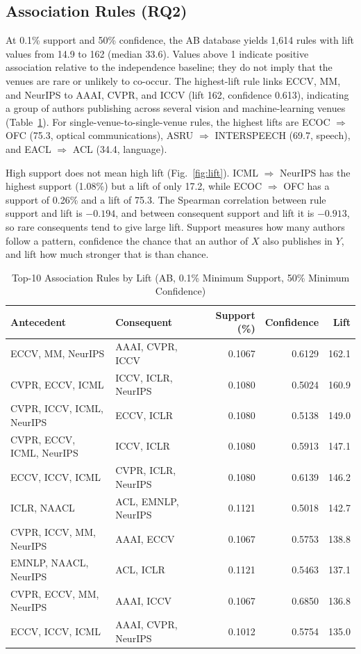 ﻿\documentclass[conference]{IEEEtran}
\begin{document}
\subsection{Association Rules (RQ2)}
At 0.1\% support and 50\% confidence, the AB database yields 1,614 rules with lift values from 14.9 to 162 (median 33.6). Values above 1 indicate positive association relative to the independence baseline; they do not imply that the venues are rare or unlikely to co-occur. The highest-lift rule links ECCV, MM, and NeurIPS to AAAI, CVPR, and ICCV (lift 162, confidence 0.613), indicating a group of authors publishing across several vision and machine-learning venues (Table~\ref{tab:rules}). For single-venue-to-single-venue rules, the highest lifts are ECOC $\Rightarrow$ OFC (75.3, optical communications), ASRU $\Rightarrow$ INTERSPEECH (69.7, speech), and EACL $\Rightarrow$ ACL (34.4, language).

High support does not mean high lift (Fig.~\ref{fig:lift}). ICML $\Rightarrow$ NeurIPS has the highest support (1.08\%) but a lift of only 17.2, while ECOC $\Rightarrow$ OFC has a support of 0.26\% and a lift of 75.3. The Spearman correlation between rule support and lift is $-0.194$, and between consequent support and lift it is $-0.913$, so rare consequents tend to give large lift. Support measures how many authors follow a pattern, confidence the chance that an author of $X$ also publishes in $Y$, and lift how much stronger that is than chance.

\begin{table}[t]
\caption{Top-10 Association Rules by Lift (AB, 0.1\% Minimum Support, 50\% Minimum Confidence)}
\label{tab:rules}
\centering
\scriptsize
\setlength{\tabcolsep}{3pt}
\begin{tabular}{p{3.15cm}p{3.15cm}rrr}
\toprule
Antecedent & Consequent & Support (\%) & Confidence & Lift \\
\midrule
ECCV, MM, NeurIPS & AAAI, CVPR, ICCV & 0.1067 & 0.6129 & 162.1 \\
CVPR, ECCV, ICML & ICCV, ICLR, NeurIPS & 0.1080 & 0.5024 & 160.9 \\
CVPR, ICCV, ICML, NeurIPS & ECCV, ICLR & 0.1080 & 0.5138 & 149.0 \\
CVPR, ECCV, ICML, NeurIPS & ICCV, ICLR & 0.1080 & 0.5913 & 147.1 \\
ECCV, ICCV, ICML & CVPR, ICLR, NeurIPS & 0.1080 & 0.6139 & 146.2 \\
ICLR, NAACL & ACL, EMNLP, NeurIPS & 0.1121 & 0.5018 & 142.7 \\
CVPR, ICCV, MM, NeurIPS & AAAI, ECCV & 0.1067 & 0.5753 & 138.8 \\
EMNLP, NAACL, NeurIPS & ACL, ICLR & 0.1121 & 0.5463 & 137.1 \\
CVPR, ECCV, MM, NeurIPS & AAAI, ICCV & 0.1067 & 0.6850 & 136.8 \\
ECCV, ICCV, ICML & AAAI, CVPR, NeurIPS & 0.1012 & 0.5754 & 135.0 \\
\bottomrule
\end{tabular}
\end{table}
\end{document}

